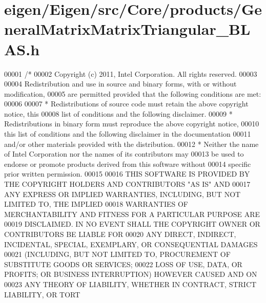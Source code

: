 \hypertarget{eigen_2_eigen_2src_2_core_2products_2_general_matrix_matrix_triangular___b_l_a_s_8h_source}{}\section{eigen/\+Eigen/src/\+Core/products/\+General\+Matrix\+Matrix\+Triangular\+\_\+\+B\+L\+AS.h}
\label{eigen_2_eigen_2src_2_core_2products_2_general_matrix_matrix_triangular___b_l_a_s_8h_source}

\begin{DoxyCode}
00001 \textcolor{comment}{/*}
00002 \textcolor{comment}{ Copyright (c) 2011, Intel Corporation. All rights reserved.}
00003 \textcolor{comment}{}
00004 \textcolor{comment}{ Redistribution and use in source and binary forms, with or without modification,}
00005 \textcolor{comment}{ are permitted provided that the following conditions are met:}
00006 \textcolor{comment}{}
00007 \textcolor{comment}{ * Redistributions of source code must retain the above copyright notice, this}
00008 \textcolor{comment}{   list of conditions and the following disclaimer.}
00009 \textcolor{comment}{ * Redistributions in binary form must reproduce the above copyright notice,}
00010 \textcolor{comment}{   this list of conditions and the following disclaimer in the documentation}
00011 \textcolor{comment}{   and/or other materials provided with the distribution.}
00012 \textcolor{comment}{ * Neither the name of Intel Corporation nor the names of its contributors may}
00013 \textcolor{comment}{   be used to endorse or promote products derived from this software without}
00014 \textcolor{comment}{   specific prior written permission.}
00015 \textcolor{comment}{}
00016 \textcolor{comment}{ THIS SOFTWARE IS PROVIDED BY THE COPYRIGHT HOLDERS AND CONTRIBUTORS "AS IS" AND}
00017 \textcolor{comment}{ ANY EXPRESS OR IMPLIED WARRANTIES, INCLUDING, BUT NOT LIMITED TO, THE IMPLIED}
00018 \textcolor{comment}{ WARRANTIES OF MERCHANTABILITY AND FITNESS FOR A PARTICULAR PURPOSE ARE}
00019 \textcolor{comment}{ DISCLAIMED. IN NO EVENT SHALL THE COPYRIGHT OWNER OR CONTRIBUTORS BE LIABLE FOR}
00020 \textcolor{comment}{ ANY DIRECT, INDIRECT, INCIDENTAL, SPECIAL, EXEMPLARY, OR CONSEQUENTIAL DAMAGES}
00021 \textcolor{comment}{ (INCLUDING, BUT NOT LIMITED TO, PROCUREMENT OF SUBSTITUTE GOODS OR SERVICES;}
00022 \textcolor{comment}{ LOSS OF USE, DATA, OR PROFITS; OR BUSINESS INTERRUPTION) HOWEVER CAUSED AND ON}
00023 \textcolor{comment}{ ANY THEORY OF LIABILITY, WHETHER IN CONTRACT, STRICT LIABILITY, OR TORT}

\end{DoxyCode}
